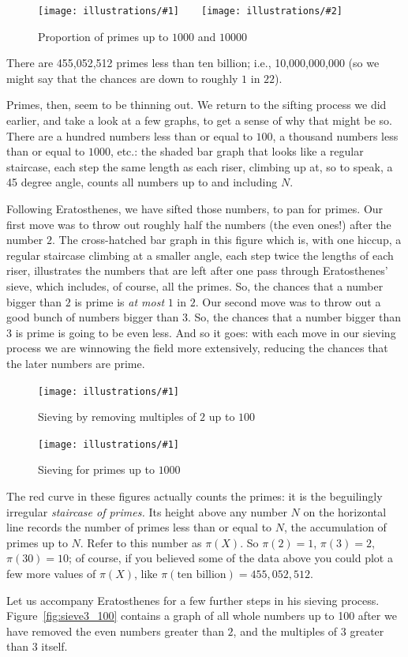 \documentclass[11pt]{article}
\newcommand{\ill}[3]{ 
   \begin{figure}[H]
   \begin{center}
   \texttt{[image: illustrations/\#1]}
   \caption{#3}
   \end{center}
    \end{figure}
}
\newcommand{\illtwo}[4]{ 
   \begin{figure}[H]
   \begin{center}
   \texttt{[image: illustrations/\#1]}$\qquad$\texttt{[image: illustrations/\#2]}
   \caption{#4}
    \end{center}
    \end{figure}
}
\theoremstyle{plain}
\theoremstyle{definition}
\numberwithin{equation}{section}
\numberwithin{figure}{section}
\numberwithin{table}{section}
\begin{document}
\illtwo{proportion_primes_1000}{proportion_primes_10000}{0.48}{Proportion of primes up to $1000$ and $10000$}

There are 455,052,512 primes less than ten billion; i.e.,
10,000,000,000 (so we might say that the chances are down to roughly
$1$ in $22$).

Primes, then, seem to be thinning out.  We return to the sifting process
we did earlier, and take a look at a few graphs, to get a sense of why
that might be so. There are a hundred numbers less than or equal to
$100$, a thousand numbers less than or equal to $1000$, etc.: the
shaded bar graph that looks like a regular staircase, each step the
same length as each riser, climbing up at, so to speak, a 45 degree
angle, counts all numbers up to and including $N$.

Following Eratosthenes, we have sifted those numbers, to pan for
primes. Our first move was to throw out roughly half the numbers (the
even ones!) after the number $2$. The cross-hatched bar graph in this
figure which is, with one hiccup, a regular staircase climbing at a
smaller angle, each step twice the lengths of each riser, illustrates
the numbers that are left after one pass through Eratosthenes' sieve,
which includes, of course, all the primes. So, the chances that a
number bigger than $2$ is prime is {\em at most} $1$ in $2$.  Our
second move was to throw out a good bunch of numbers bigger than $3$.
So, the chances that a number bigger than $3$ is prime is going to be
even less.  And so it goes: with each move in our
sieving process we are winnowing the field more extensively, reducing
the chances that the later numbers are prime.

\ill{sieve_2_200}{.8}{Sieving by removing multiples of $2$ up to $100$}
\ill{sieve1000}{.8}{Sieving for primes up to $1000$}
          
The red curve in these figures actually counts the primes: it is the
beguilingly irregular {\em staircase of primes.}  Its height above any
number $N$ on the horizontal line records the number of primes less
than or equal to $N$, the accumulation of primes up to $N$.  Refer to
this number as $\pi(X)$. So $\pi(2)=1$, $\pi(3) = 2$, $\pi(30) = 10$; of
course, if you believed some of the data above you could plot a few
more values of $\pi(X)$, like $\pi(\text{ten billion}) = 455,052,512$.
                              
                                 
Let us accompany Eratosthenes for a few further steps in his sieving
process.  Figure~\ref{fig:sieve3_100} contains a graph of all whole
numbers up to 100 after we have removed the even numbers greater than
$2$, and the multiples of $3$ greater than $3$ itself.
                                 
\end{document}
